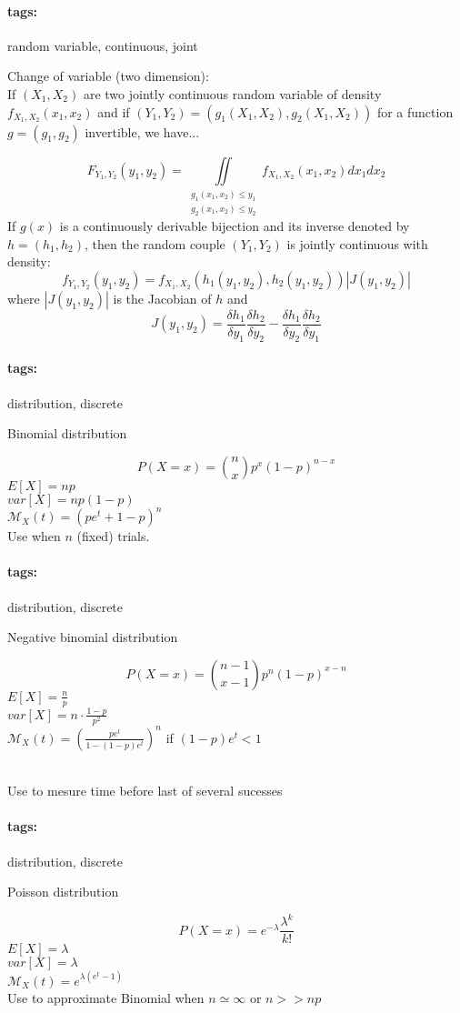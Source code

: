 \documentclass[12pt]{article}
\newcommand*{\xfield}[1]{\begin{mdframed}\centering #1\end{mdframed}\bigskip}
\newenvironment{note}{}{}
\newcommand*{\tags}[1]{\paragraph{tags: }#1}
\begin{document}
\begin{note}
	\tags{random variable, continuous, joint}
	\xfield{Change of variable (two dimension):\\
If $(X_1,X_2)$ are two jointly continuous random variable of density $f_{X_1,X_2}(x_1,x_2)$ and if
    $(Y_1,Y_2)=(g_1(X_1,X_2),g_2(X_1,X_2))$ for a function $g=(g_1,g_2)$ invertible, we have...} %
	\xfield{$$F_{Y_1,Y_2}(y_1,y_2) = \iint\limits_{\substack{g_1(x_1,x_2)\le y_1
        \\ g_2(x_1,x_2) \le y_2}} f_{X_1,X_2}(x_1,x_2)dx_1 dx_2$$
If $g(x)$ is a continuously derivable bijection and its inverse denoted by
$h=(h_1,h_2)$, then the random couple $(Y_1,Y_2)$ is jointly continuous with
density:
$$f_{Y_1,Y_2}(y_1,y_2) = f_{X_1,X_2}(h_1(y_1,y_2),h_2(y_1,y_2)) | J(y_1,y_2) |$$
where $|J(y_1,y_2)|$ is the Jacobian of $h$ and
$$J(y_1,y_2) = \frac{\delta h_1}{\delta y_1}\frac{\delta h_2}{\delta y_2} -
\frac{\delta h_1}{\delta y_2} \frac{\delta h_2}{\delta y_1}$$
} %
\end{note}

\begin{note}
\tags{distribution, discrete}
\xfield{Binomial distribution}
\xfield{$$P(X = x) = \binom{n}{x} p^x (1-p)^{n-x}$$
$E[X] = np$\\
$var[X] = np(1-p)$\\
$\mathcal{M}_X(t) = (pe^t+1-p)^n$\\
Use when $n$ (fixed) trials.
}
\end{note}

\begin{note}
\tags{distribution, discrete}
\xfield{Negative binomial distribution}
\xfield{$$P(X = x) = \binom{n-1}{x-1}p^n(1-p)^{x-n}$$
$E[X] = \frac{n}{p}$\\
$var[X] = n \cdot \frac{1-p}{p^2}$\\
$\mathcal{M}_X(t) = \left(  \frac{pe^t}{1-(1-p)e^t}\right)^n$ if $(1-p)e^t < 1$}\\
Use to mesure time before last of several sucesses
\end{note}

\begin{note}
\tags{distribution, discrete}
\xfield{Poisson distribution}
\xfield{$$P(X = x) = e^{-\lambda}\frac{\lambda^k}{k!}$$
$E[X] = \lambda$\\
$var[X] = \lambda$\\
$\mathcal{M}_X(t) = e^{\lambda(e^t-1)}$\\
Use to approximate Binomial when $n\simeq \infty$ or $n >> np$}
\end{note}
\end{document}
